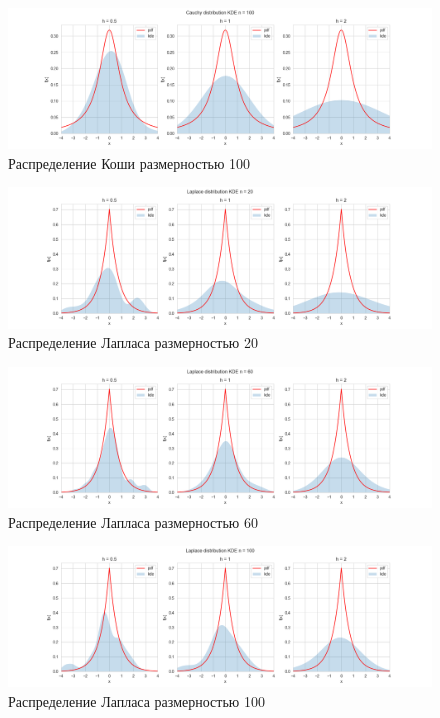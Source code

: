 \documentclass[a4paper,14pt]{article}
\begin{document}
	\begin{figure}[H]
		\centering
		\includegraphics[scale=0.35]{../image/lab4/lab4_kde_cauchy_100.png}
		\caption{Распределение Коши размерностью 100}
	\end{figure}
	
	\begin{figure}[H]
		\centering
		\includegraphics[scale=0.35]{../image/lab4/lab4_kde_laplace_20.png}
		\caption{Распределение Лапласа размерностью 20}
	\end{figure}
	
	\begin{figure}[H]
		\centering
		\includegraphics[scale=0.35]{../image/lab4/lab4_kde_laplace_60.png}
		\caption{Распределение Лапласа размерностью 60}
	\end{figure}
	
	\begin{figure}[H]
		\centering
		\includegraphics[scale=0.35]{../image/lab4/lab4_kde_laplace_100.png}
		\caption{Распределение Лапласа размерностью 100}
	\end{figure}
	
\end{document}
